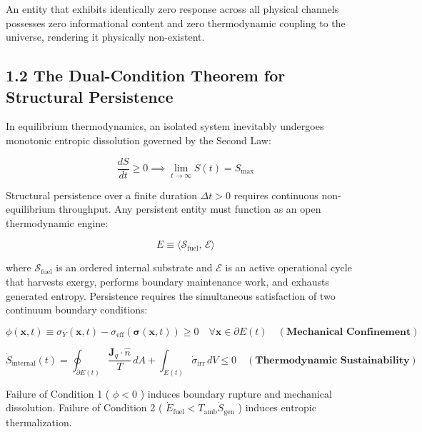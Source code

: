 \documentclass[11pt,a4paper]{article}
\theoremstyle{definition}\newtheorem{definition}{Definition}
\theoremstyle{remark}\newtheorem{remark}{Remark}
\begin{document}
An entity that exhibits identically zero response across all physical channels possesses zero informational content and zero thermodynamic coupling to the universe, rendering it physically non-existent.
\subsection{1.2 The Dual-Condition Theorem for Structural Persistence}

In equilibrium thermodynamics, an isolated system inevitably undergoes monotonic entropic dissolution governed by the Second Law:


\begin{equation}
\frac{dS}{dt} \ge 0 \implies \lim_{t \to \infty} S(t) = S_{\text{max}}
\end{equation}


Structural persistence over a finite duration $\Delta t > 0$ requires continuous non-equilibrium throughput. Any persistent entity must function as an open thermodynamic engine:


\begin{equation}
E \equiv \langle \mathcal{S}_{\text{fuel}},\, \mathcal{E} \rangle
\end{equation}


where $\mathcal{S}_{\text{fuel}}$ is an ordered internal substrate and $\mathcal{E}$ is an active operational cycle that harvests exergy, performs boundary maintenance work, and exhausts generated entropy. Persistence requires the simultaneous satisfaction of two continuum boundary conditions:


\begin{equation}
\phi(\mathbf{x}, t) \equiv \sigma_Y(\mathbf{x}, t) - \sigma_{\text{eff}}(\boldsymbol{\sigma}(\mathbf{x}, t)) \ge 0 \quad \forall \mathbf{x} \in \partial E(t) \quad (\textbf{Mechanical Confinement})
\end{equation}



\begin{equation}
\dot{S}_{\text{internal}}(t) = \oint_{\partial E(t)} \frac{\mathbf{J}_q \cdot \hat{n}}{T} \, dA + \int_{E(t)} \dot{\sigma}_{\text{irr}} \, dV \le 0 \quad (\textbf{Thermodynamic Sustainability})
\end{equation}


Failure of Condition 1 ( $\phi < 0$ ) induces boundary rupture and mechanical dissolution. Failure of Condition 2 ( $\dot{E}_{\text{fuel}} < T_{\text{amb}} \dot{S}_{\text{gen}}$ ) induces entropic thermalization.
\end{document}
